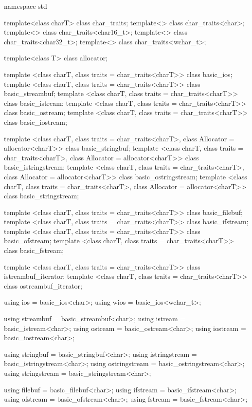 \begin{codeblock}
namespace std {
  template<class charT> class char_traits;
  template<> class char_traits<char>;
  template<> class char_traits<char16_t>;
  template<> class char_traits<char32_t>;
  template<> class char_traits<wchar_t>;

  template<class T> class allocator;

  template <class charT, class traits = char_traits<charT>>
    class basic_ios;
  template <class charT, class traits = char_traits<charT>>
    class basic_streambuf;
  template <class charT, class traits = char_traits<charT>>
    class basic_istream;
  template <class charT, class traits = char_traits<charT>>
    class basic_ostream;
  template <class charT, class traits = char_traits<charT>>
    class basic_iostream;

  template <class charT, class traits = char_traits<charT>,
      class Allocator = allocator<charT>>
    class basic_stringbuf;
  template <class charT, class traits = char_traits<charT>,
      class Allocator = allocator<charT>>
    class basic_istringstream;
  template <class charT, class traits = char_traits<charT>,
      class Allocator = allocator<charT>>
    class basic_ostringstream;
  template <class charT, class traits = char_traits<charT>,
      class Allocator = allocator<charT>>
    class basic_stringstream;

  template <class charT, class traits = char_traits<charT>>
    class basic_filebuf;
  template <class charT, class traits = char_traits<charT>>
    class basic_ifstream;
  template <class charT, class traits = char_traits<charT>>
    class basic_ofstream;
  template <class charT, class traits = char_traits<charT>>
    class basic_fstream;

  template <class charT, class traits = char_traits<charT>>
    class istreambuf_iterator;
  template <class charT, class traits = char_traits<charT>>
    class ostreambuf_iterator;

  using ios  = basic_ios<char>;
  using wios = basic_ios<wchar_t>;

  using streambuf = basic_streambuf<char>;
  using istream   = basic_istream<char>;
  using ostream   = basic_ostream<char>;
  using iostream  = basic_iostream<char>;

  using stringbuf     = basic_stringbuf<char>;
  using istringstream = basic_istringstream<char>;
  using ostringstream = basic_ostringstream<char>;
  using stringstream  = basic_stringstream<char>;

  using filebuf  = basic_filebuf<char>;
  using ifstream = basic_ifstream<char>;
  using ofstream = basic_ofstream<char>;
  using fstream  = basic_fstream<char>;

}
\end{codeblock}
